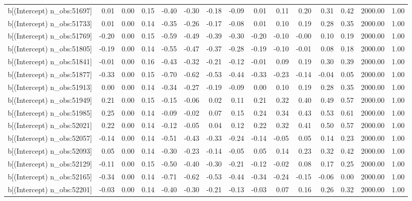 \begin{table}[ht]
\begin{tabular}{rrrrrrrrrrrrrrr}
  b[(Intercept) n\_obs:51697] & 0.01 & 0.00 & 0.15 & -0.40 & -0.30 & -0.18 & -0.09 & 0.01 & 0.11 & 0.20 & 0.31 & 0.42 & 2000.00 & 1.00 \\ 
  b[(Intercept) n\_obs:51733] & 0.01 & 0.00 & 0.14 & -0.35 & -0.26 & -0.17 & -0.08 & 0.01 & 0.10 & 0.19 & 0.28 & 0.35 & 2000.00 & 1.00 \\ 
  b[(Intercept) n\_obs:51769] & -0.20 & 0.00 & 0.15 & -0.59 & -0.49 & -0.39 & -0.30 & -0.20 & -0.10 & -0.00 & 0.10 & 0.19 & 2000.00 & 1.00 \\ 
  b[(Intercept) n\_obs:51805] & -0.19 & 0.00 & 0.14 & -0.55 & -0.47 & -0.37 & -0.28 & -0.19 & -0.10 & -0.01 & 0.08 & 0.18 & 2000.00 & 1.00 \\ 
  b[(Intercept) n\_obs:51841] & -0.01 & 0.00 & 0.16 & -0.43 & -0.32 & -0.21 & -0.12 & -0.01 & 0.09 & 0.19 & 0.30 & 0.39 & 2000.00 & 1.00 \\ 
  b[(Intercept) n\_obs:51877] & -0.33 & 0.00 & 0.15 & -0.70 & -0.62 & -0.53 & -0.44 & -0.33 & -0.23 & -0.14 & -0.04 & 0.05 & 2000.00 & 1.00 \\ 
  b[(Intercept) n\_obs:51913] & 0.00 & 0.00 & 0.14 & -0.34 & -0.27 & -0.19 & -0.09 & 0.00 & 0.10 & 0.19 & 0.28 & 0.35 & 2000.00 & 1.00 \\ 
  b[(Intercept) n\_obs:51949] & 0.21 & 0.00 & 0.15 & -0.15 & -0.06 & 0.02 & 0.11 & 0.21 & 0.32 & 0.40 & 0.49 & 0.57 & 2000.00 & 1.00 \\ 
  b[(Intercept) n\_obs:51985] & 0.25 & 0.00 & 0.14 & -0.09 & -0.02 & 0.07 & 0.15 & 0.24 & 0.34 & 0.43 & 0.53 & 0.61 & 2000.00 & 1.00 \\ 
  b[(Intercept) n\_obs:52021] & 0.22 & 0.00 & 0.14 & -0.12 & -0.05 & 0.04 & 0.12 & 0.22 & 0.32 & 0.41 & 0.50 & 0.57 & 2000.00 & 1.00 \\ 
  b[(Intercept) n\_obs:52057] & -0.14 & 0.00 & 0.14 & -0.51 & -0.43 & -0.33 & -0.24 & -0.14 & -0.05 & 0.05 & 0.14 & 0.23 & 2000.00 & 1.00 \\ 
  b[(Intercept) n\_obs:52093] & 0.05 & 0.00 & 0.14 & -0.30 & -0.23 & -0.14 & -0.05 & 0.05 & 0.14 & 0.23 & 0.32 & 0.42 & 2000.00 & 1.00 \\ 
  b[(Intercept) n\_obs:52129] & -0.11 & 0.00 & 0.15 & -0.50 & -0.40 & -0.30 & -0.21 & -0.12 & -0.02 & 0.08 & 0.17 & 0.25 & 2000.00 & 1.00 \\ 
  b[(Intercept) n\_obs:52165] & -0.34 & 0.00 & 0.14 & -0.71 & -0.62 & -0.53 & -0.44 & -0.34 & -0.24 & -0.15 & -0.06 & 0.00 & 2000.00 & 1.00 \\ 
  b[(Intercept) n\_obs:52201] & -0.03 & 0.00 & 0.14 & -0.40 & -0.30 & -0.21 & -0.13 & -0.03 & 0.07 & 0.16 & 0.26 & 0.32 & 2000.00 & 1.00 \\ 

\end{tabular}
\end{table}
